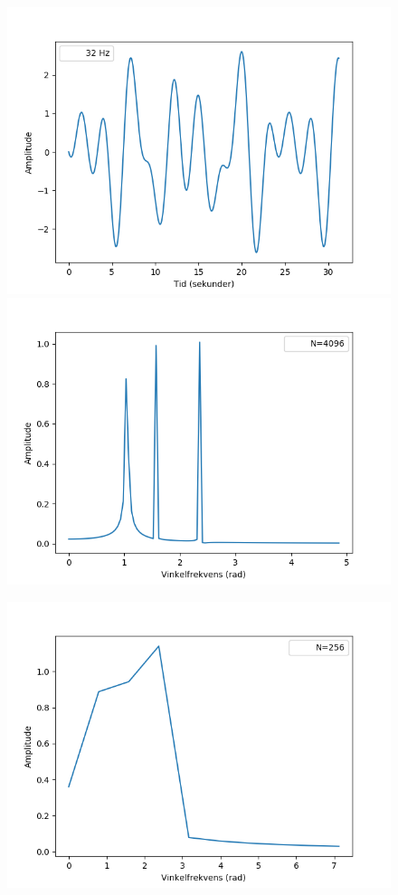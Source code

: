 \begin{figure}[H]
\begin{minipage}{0.49\textwidth}
\includegraphics[width=\textwidth]{figures/signal_32hz.png}
\includegraphics[width=\textwidth]{figures/frekvensanalyse/32hz_freq2}
\end{minipage}
\begin{minipage}{0.49\textwidth}
\includegraphics[width=\textwidth]{figures/frekvensanalyse/32hz_freq1.png}

\end{minipage}
\end{figure}
